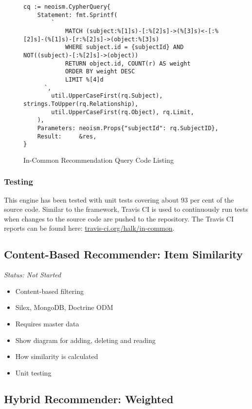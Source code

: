 \begin{figure}[!ht]
    \begin{verbatim}
cq := neoism.CypherQuery{
    Statement: fmt.Sprintf(
        `
            MATCH (subject:%[1]s)-[:%[2]s]->(%[3]s)<-[:%[2]s]-(%[1]s)-[r:%[2]s]->(object:%[3]s)
            WHERE subject.id = {subjectId} AND NOT((subject)-[:%[2]s]->(object))
            RETURN object.id, COUNT(r) AS weight
            ORDER BY weight DESC
            LIMIT %[4]d
      `,
        util.UpperCaseFirst(rq.Subject), strings.ToUpper(rq.Relationship),
        util.UpperCaseFirst(rq.Object), rq.Limit,
    ),
    Parameters: neoism.Props{"subjectId": rq.SubjectID},
    Result:     &res,
}
    \end{verbatim}
    \caption{In-Common Recommendation Query Code Listing}
    \label{fig:implementation-incommon-recommendation-query}
\end{figure}

\subsubsection{Testing}

This engine has been tested with unit tests covering about 93 per cent of the source code. Similar to the framework, Travis CI is used to continuously run tests when changes to the source code are pushed to the repository. The Travis CI reports can be found here: \href{https://travis-ci.org/halk/in-common}{travis-ci.org/halk/in-common}.

\subsection{Content-Based Recommender: Item Similarity}

\emph{Status: Not Started}

\begin{itemize}
\item Content-based filtering
\item Silex, MongoDB, Doctrine ODM
\item Requires master data
\item Show diagram for adding, deleting and reading
\item How similarity is calculated
\item Unit testing
\end{itemize}

\subsection{Hybrid Recommender: Weighted}

